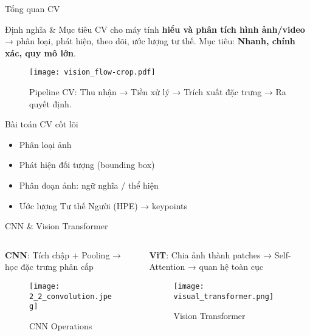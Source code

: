 \begin{frame}{Tổng quan CV}
\begin{block}{Định nghĩa \& Mục tiêu}
CV cho máy tính \textbf{hiểu và phân tích hình ảnh/video} → phân loại, phát hiện, theo dõi, ước lượng tư thế.  
Mục tiêu: \textbf{Nhanh, chính xác, quy mô lớn}.
\end{block}
\begin{figure}
    \centering
    \texttt{[image: vision\_flow-crop.pdf]}
    \caption{Pipeline CV: Thu nhận → Tiền xử lý → Trích xuất đặc trưng → Ra quyết định.}
\end{figure}
\end{frame}

\begin{frame}{Bài toán CV cốt lõi}
\begin{itemize}
    \item Phân loại ảnh
    \item Phát hiện đối tượng (bounding box)
    \item Phân đoạn ảnh: ngữ nghĩa / thể hiện
    \item Ước lượng Tư thế Người (HPE) → keypoints
\end{itemize}
\end{frame}

\begin{frame}{CNN \& Vision Transformer}
\begin{columns}[T]
\begin{column}{0.5\textwidth}
\textbf{CNN}: Tích chập + Pooling → học đặc trưng phân cấp
\begin{figure}
\centering
\texttt{[image: 2\_2\_convolution.jpeg]}
\caption{CNN Operations}
\end{figure}
\end{column}
\begin{column}{0.5\textwidth}
\textbf{ViT}: Chia ảnh thành patches → Self-Attention → quan hệ toàn cục
\begin{figure}
\centering
\texttt{[image: visual\_transformer.png]}
\caption{Vision Transformer}
\end{figure}
\end{column}
\end{columns}
\end{frame}


